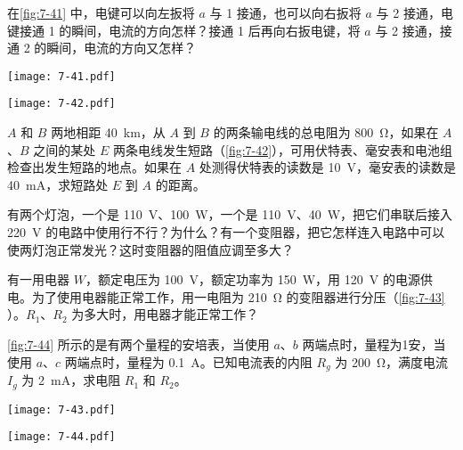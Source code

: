 \begin{Exercise}
\begin{question}
  \item 在\cref{fig:7-41} 中，电键可以向左扳将 $a$ 与 1 接通，也可以向右扳将 $a$ 与 2 接通，电键接通 1 的瞬间，电流的方向怎样？接通 1 后再向右扳电键，将 $a$ 与 2 接通，接通 2 的瞬间，电流的方向又怎样？
  \begin{figurehere}
    \begin{minipage}{\linewidth}
      \begin{minipage}[b]{0.48\linewidth}\centering
        \texttt{[image: 7-41.pdf]}
        \caption{}\label{fig:7-41}
      \end{minipage}
      \begin{minipage}[b]{0.48\linewidth}\centering
        \texttt{[image: 7-42.pdf]}
        \caption{}\label{fig:7-42}
      \end{minipage}
    \end{minipage}
  \end{figurehere}
  \item $A$ 和 $B$ 两地相距 \qty{40}{km}，从 $A$ 到 $B$ 的两条输电线的总电阻为 \qty{800}{\ohm}，如果在 $A$、$B$ 之间的某处 $E$ 两条电线发生短路（\cref{fig:7-42}），可用伏特表、毫安表和电池组检查出发生短路的地点。如果在 $A$ 处测得伏特表的读数是 \qty{10}{V}，毫安表的读数是 \qty{40}{mA}，求短路处 $E$ 到 $A$ 的距离。
  \item 有两个灯泡，一个是 \qty{110}{V}、\qty{100}{W}，一个是 \qty{110}{V}、\qty{40}{W}，把它们串联后接入 \qty{220}{V} 的电路中使用行不行？为什么？有一个变阻器，把它怎样连入电路中可以使两灯泡正常发光？这时变阻器的阻值应调至多大？
  \item 有一用电器 $W$，额定电压为 \qty{100}{V}，额定功率为 \qty{150}{W}，用  \qty{120}{V} 的电源供电。为了使用电器能正常工作，用一电阻为 \qty{210}{\ohm} 的变阻器进行分压（\cref{fig:7-43} ）。$R_1$、$R_2$ 为多大时，用电器才能正常工作？
  \item \cref{fig:7-44} 所示的是有两个量程的安培表，当使用 $a$、$b$ 两端点时，量程为1安，当使用 $a$、$c$ 两端点时，量程为 \qty{0.1}{A}。已知电流表的内阻 $R_g$ 为 \qty{200}{\ohm}，满度电流 $I_g$ 为 \qty{2}{mA}，求电阻 $R_1$ 和 $R_2$。
  \begin{figurehere}
    \begin{minipage}[b]{0.48\linewidth}	\centering
      \texttt{[image: 7-43.pdf]}
      \caption{}\label{fig:7-43}
    \end{minipage}
    \begin{minipage}[b]{0.48\linewidth}\centering
      \texttt{[image: 7-44.pdf]}

\end{minipage}
\end{figurehere}
\end{question}
\end{Exercise}
